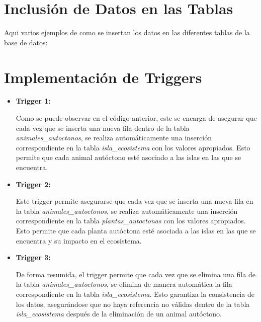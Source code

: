 \documentclass[11pt]{report}
\begin{document}
\section{Inclusión de Datos en las Tablas}
Aqui varios ejemplos de como se insertan los datos en las diferentes tablas de la base de datos:
\lstset{style=mystyle}


\newpage

\section{Implementación de Triggers}
\begin{itemize}
      \item \textbf{Trigger 1:} 
            \lstset{style=mystyle}
            

Como se puede observar en el código anterior, este se encarga de asegurar que cada vez que se inserta una nueva fila dentro de la tabla \emph{animales\_autoctonos}, se realiza automáticamente una inserción correspondiente en la tabla \emph{isla\_ecosistema} con los valores apropiados. Esto permite que cada animal autóctono esté asociado a las islas en las que se encuentra.

      \item \textbf{Trigger 2:} 
            \lstset{style=mystyle}
            

Este trigger permite asegurarse que cada vez que se inserta una nueva fila en la tabla \emph{animales\_autoctonos}, se realiza automáticamente una inserción correspondiente en la tabla \emph{plantas\_autoctonas} con los valores apropiados. Esto permite que cada planta autóctona esté asociada a las islas en las que se encuentra y su impacto en el ecosistema.

      \item \textbf{Trigger 3:} 
            \lstset{style=mystyle}
            

De forma resumida, el trigger permite que cada vez que se elimina una fila de la tabla \emph{animales\_autoctonos}, se elimina de manera automática la fila correspondiente en la tabla \emph{isla\_ecosistema}. Esto garantiza la consistencia de los datos, asegurándose que no haya referencia no válidas dentro de la tabla \emph{isla\_ecosistema} después de la eliminación de un animal autóctono.


\end{itemize}
\end{document}
